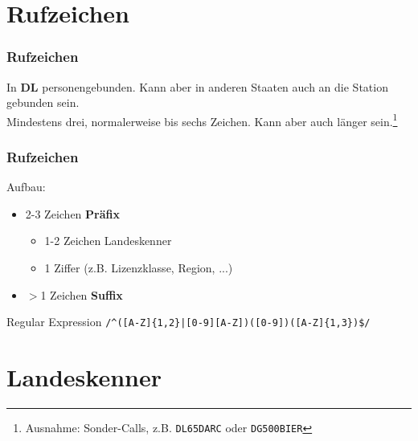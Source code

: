 %
%

\section{Rufzeichen}

\begin{frame}
  \frametitle{Rufzeichen}

  In \textbf{DL} personengebunden. Kann aber in anderen Staaten auch an die Station
  gebunden sein. \\[1em]

  Mindestens drei, normalerweise bis sechs Zeichen. Kann aber auch länger
  sein.\footnote{\scriptsize Ausnahme: Sonder-Calls, z.B.
  \texttt{DL65DARC} oder \texttt{DG500BIER}}

\end{frame}

\begin{frame}[fragile]
  \frametitle{Rufzeichen}

  Aufbau:

  \begin{itemize}
    \item 2-3 Zeichen \textbf{Präfix}
      \begin{itemize}
        \item 1-2 Zeichen Landeskenner
        \item 1 Ziffer (z.B. Lizenzklasse, Region, ...)
      \end{itemize}
    \item $>$1 Zeichen \textbf{Suffix}
  \end{itemize}

  \pause

  \begin{block}{Regular Expression}
    \verb+/^([A-Z]{1,2}|[0-9][A-Z])([0-9])([A-Z]{1,3})$/+
  \end{block}


\end{frame}

\section{Landeskenner}

